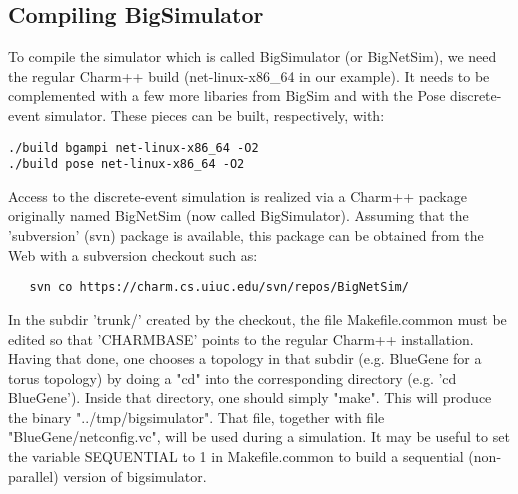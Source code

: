 \subsection{Compiling BigSimulator}

To compile the simulator which is called BigSimulator (or BigNetSim), we need
the regular Charm++ build (net-linux-x86\_64 in our example).  It needs to be
complemented with a few more libaries from BigSim and with the Pose
discrete-event simulator. These pieces can be built, respectively, with:

\begin{verbatim}
./build bgampi net-linux-x86_64 -O2
./build pose net-linux-x86_64 -O2
\end{verbatim}

Access to the discrete-event simulation is realized via a Charm++ package
originally named BigNetSim (now called BigSimulator). Assuming that the
'subversion' (svn) package is available, this package can be obtained from the
Web with a subversion checkout such as:

\begin{verbatim}
   svn co https://charm.cs.uiuc.edu/svn/repos/BigNetSim/
\end{verbatim}

In the subdir 'trunk/' created by the checkout, the file Makefile.common must
be edited so that 'CHARMBASE' points to the regular Charm++ installation.
Having that done, one chooses a topology in that subdir (e.g. BlueGene for a
torus topology) by doing a "cd" into the corresponding directory (e.g. 'cd
BlueGene').  Inside that directory, one should simply "make". This will produce
the binary "../tmp/bigsimulator". That file, together with file
"BlueGene/netconfig.vc", will be used during a simulation. It may be useful to
set the variable SEQUENTIAL to 1 in Makefile.common to build a sequential
(non-parallel) version of bigsimulator.

